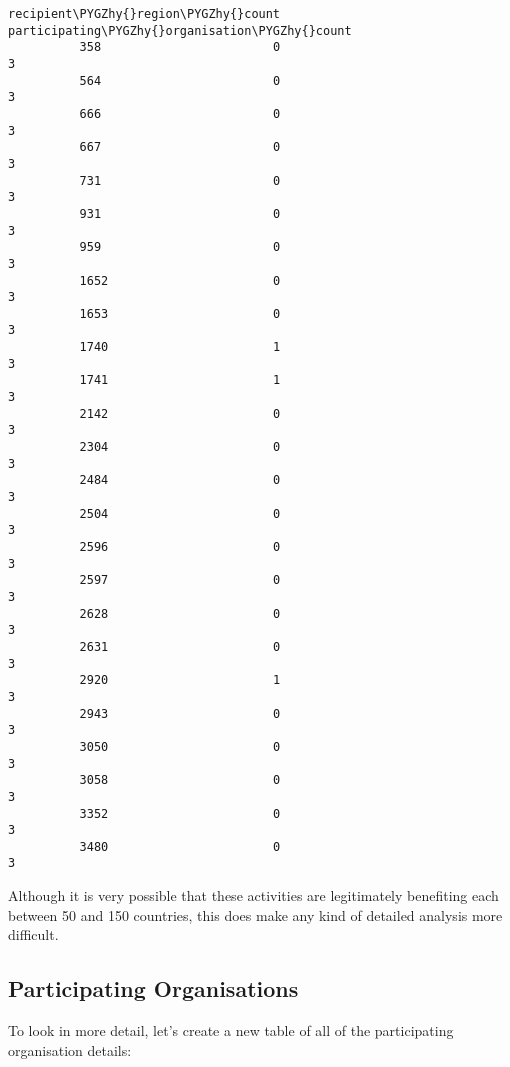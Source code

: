 \documentclass[letterpaper,10pt,english]{sphinxmanual}
\begin{document}
\begin{Verbatim}[commandchars=\\\{\}]
                recipient\PYGZhy{}region\PYGZhy{}count  participating\PYGZhy{}organisation\PYGZhy{}count
          358                        0                                 3
          564                        0                                 3
          666                        0                                 3
          667                        0                                 3
          731                        0                                 3
          931                        0                                 3
          959                        0                                 3
          1652                       0                                 3
          1653                       0                                 3
          1740                       1                                 3
          1741                       1                                 3
          2142                       0                                 3
          2304                       0                                 3
          2484                       0                                 3
          2504                       0                                 3
          2596                       0                                 3
          2597                       0                                 3
          2628                       0                                 3
          2631                       0                                 3
          2920                       1                                 3
          2943                       0                                 3
          3050                       0                                 3
          3058                       0                                 3
          3352                       0                                 3
          3480                       0                                 3
\end{Verbatim}

Although it is very possible that these activities are legitimately
benefiting each between 50 and 150 countries, this does make any kind of
detailed analysis more difficult.


\subsection{Participating Organisations}
\label{\detokenize{Global Affairs Canada - Compliance Report:Participating-Organisations}}
To look in more detail, let's create a new table of all of the
participating organisation details:
\end{document}
